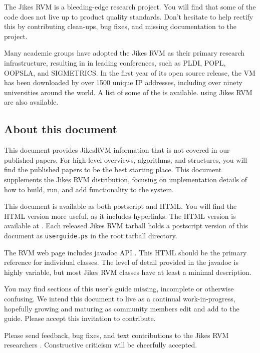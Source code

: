 The Jikes RVM is a bleeding-edge research project.  You will find that
some of the code  does not live up to product  
quality standards. Don't hesitate to help rectify this by
contributing clean-ups, bug fixes, and missing documentation to 
the project.  

Many academic groups have adopted the Jikes RVM as their primary
research infrastructure, resulting in 
in leading
conferences, such as PLDI, POPL, OOPSLA, and SIGMETRICS.  In the first year
of its open source release, the VM has been downloaded by over
1500 unique IP addresses, including over ninety
universities around the world. A list
of some of the  is available.
 using
Jikes RVM are also available.

\JikesTMFooter

\JavaTMFooter

\subsection {About this document}

This document provides Jikes\trademark RVM information that is not covered in
our published papers.  For high-level overviews, algorithms, and
structures, you will find the published papers to be the best starting
place. This document supplements
the Jikes RVM distribution, focusing on implementation
details of how to build, run, and add functionality to the system.

This document is available as both postscript and HTML.  You will find the
HTML version more useful, as it includes hyperlinks. The HTML version is
available at 
\xlink{{\tt \RVMUserGuideURL}}{\RVMUserGuideURL}.  Each released Jikes RVM
tarball holds a postscript version of this document as {\tt userguide.ps}
in the root tarball directory.

The RVM web page includes javadoc API 
. 
This HTML should be the primary reference for individual classes. The
level of detail provided in the javadoc is highly variable, but most
Jikes RVM classes have at least a minimal description.

You may find sections of this user's guide missing, incomplete or
otherwise confusing. We intend this document to live as a continual
work-in-progress, hopefully growing and maturing as community members
edit and add to the guide.  Please accept this invitation to
contribute.

Please send feedback, bug fixes, and text contributions to the Jikes RVM
researchers 
.  
Constructive criticism will be cheerfully accepted. 

\JikesTMFooter
